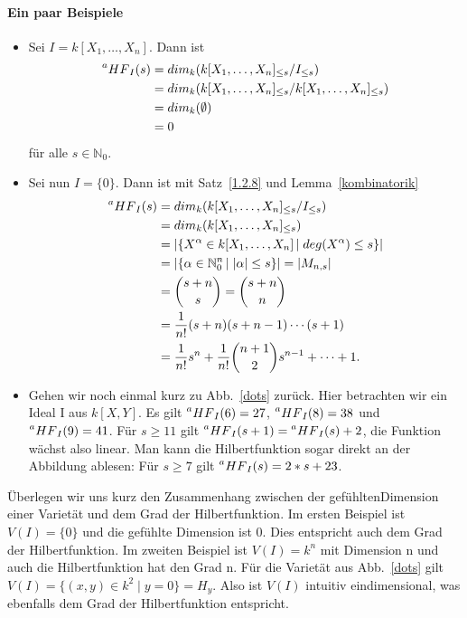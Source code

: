 \documentclass{article}
\newcommand*{\R}{k[X_{1},\ldots,X_{n}]}
\begin{document}
	\paragraph{Ein paar Beispiele}
	\begin{itemize}
	\item Sei \(I = \R\). Dann ist
		\begin{align*}
			\prescript{a}{}{HF}_{I}(s) &= dim_{k}(\R_{\leq s}/I_{\leq s}) \\
			&= dim_{k}(\R_{\leq s}/\R_{\leq s}) \\
			&= dim_{k}(\emptyset) \\
			&= 0
		\end{align*}
	 für alle \(s \in \mathbb{N}_{0}\).  
	\item Sei nun \(I = \{0\}\). Dann ist mit Satz~\ref{1.2.8} und Lemma~\ref{kombinatorik}
		\begin{align*}
			\prescript{a}{}{HF}_{I}(s) &= dim_{k}(\R_{\leq s}/I_{\leq s}) \\
			&= dim_{k}(\R_{\leq s}) \\
			&= |\{ X^{\alpha} \in \R\, |\; deg(X^{\alpha}) \leq s\}| \\
			&= |\{ \alpha \in \mathbb{N}^{n}_{0}\, |\; |\alpha| \leq s\}| = |M_{n,s}| \\
			&= \binom{s+n}{s} = \binom{s+n}{n} \\
			&= \frac{1}{n!}(s+n)(s+n-1)\cdots (s+1) \\
			&= \frac{1}{n!}s^{n} + \frac{1}{n!}\binom{n+1}{2}s^{n-1} + \cdots + 1. \\
		\end{align*}
	\item Gehen wir noch einmal kurz zu Abb.~\ref{dots} zurück. Hier betrachten wir ein 
	Ideal I aus \(k[X,Y]\). Es gilt \(\prescript{a}{}{HF}_{I}(6) = 27\),
	\(\prescript{a}{}{HF}_{I}(8) = 38\) und \(\prescript{a}{}{HF}_{I}(9) = 41\).
	Für \(s \geq 11\) gilt \(\prescript{a}{}{HF}_{I}(s+1) = \prescript{a}{}{HF}_{I}(s) + 2\),
	die Funktion wächst also linear. Man kann die Hilbertfunktion sogar direkt an der Abbildung
	ablesen: Für \(s \geq 7\) gilt \(\prescript{a}{}{HF}_{I}(s) = 2*s + 23\).
	\end{itemize}

	Überlegen wir uns kurz den Zusammenhang zwischen der \glqq gefühlten\grqq  Dimension einer Varietät und
	dem Grad der Hilbertfunktion. Im ersten Beispiel ist \(V(I) = \{0\}\) und die gefühlte
	Dimension ist 0. Dies entspricht auch dem Grad der Hilbertfunktion. Im zweiten Beispiel ist
	\(V(I) = k^n\) mit Dimension n und auch die Hilbertfunktion hat den Grad n. Für die Varietät 
	aus Abb.~\ref{dots} gilt \(V(I) = \{(x,y) \in k^2\;|\; y = 0\} = H_y\). Also ist \(V(I)\)
	intuitiv eindimensional, was ebenfalls dem Grad der Hilbertfunktion entspricht.
\end{document}
